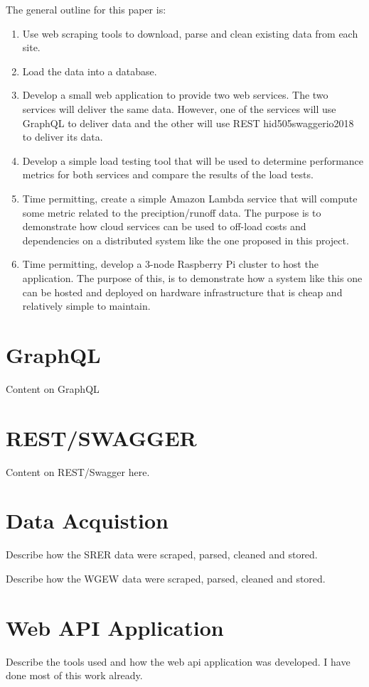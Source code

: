 The general outline for this paper is:

\begin{enumerate}
\item Use web scraping tools to download, parse and clean existing data from each 
site.  
\item Load the data into a database.  
\item Develop a small web application to provide two web services.  The two 
services will deliver the same data.  However, one of the services will use 
GraphQL to deliver data and the other will use REST \cite{}hid505swaggerio2018 to 
deliver its data. 
\item Develop a simple load testing tool that will be used to determine 
performance metrics for both services and compare the results of the load tests.
\item Time permitting, create a simple Amazon Lambda service that will compute some metric related to 
the preciption/runoff data.  The purpose is to demonstrate how cloud services can 
be used to off-load costs and dependencies on a distributed system like the one 
proposed in this project.
\item Time permitting, develop a 3-node Raspberry Pi cluster to host the application.  The purpose 
of this, is to demonstrate how a system like this one can be hosted and deployed 
on hardware infrastructure that is cheap and relatively simple to maintain.
\end{enumerate}

\section{GraphQL}
Content on GraphQL

\section{REST/SWAGGER}
Content on REST/Swagger here.

\section{Data Acquistion}
Describe how the SRER data were scraped, parsed, cleaned and stored.

Describe how the WGEW data were scraped, parsed, cleaned and stored.

\section{Web API Application}
Describe the tools used and how the web api application was developed.
I have done most of this work already.

